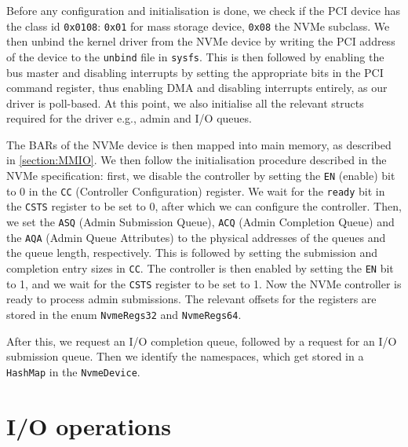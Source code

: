 Before any configuration and initialisation is done, we check if the PCI device has the class id \texttt{0x0108}: \texttt{0x01} for mass storage device, \texttt{0x08} the NVMe subclass.
We then unbind the kernel driver from the NVMe device by writing the PCI address of the device to the \texttt{unbind} file in \texttt{sysfs}. This is then followed by enabling the bus master and disabling interrupts by setting the appropriate bits in the PCI command register, thus enabling DMA and disabling interrupts entirely, as our driver is poll-based. At this point, we also initialise all the relevant structs required for the driver e.g., admin and I/O queues.

The BARs of the NVMe device is then mapped into main memory, as described in \autoref{section:MMIO}. We then follow the initialisation procedure described in the NVMe specification: first, we disable the controller by setting the \texttt{EN} (enable) bit to 0 in the \texttt{CC} (Controller Configuration) register. We wait for the \texttt{ready} bit in the \texttt{CSTS} register to be set to 0, after which we can configure the controller. Then, we set the \texttt{ASQ} (Admin Submission Queue), \texttt{ACQ} (Admin Completion Queue) and the \texttt{AQA} (Admin Queue Attributes) to the physical addresses of the queues and the queue length, respectively. This is followed by setting the submission and completion entry sizes in \texttt{CC}. The controller is then enabled by setting the \texttt{EN} bit to 1, and we wait for the \texttt{CSTS} register to be set to 1. Now the NVMe controller is ready to process admin submissions. The relevant offsets for the registers are stored in the enum \texttt{NvmeRegs32} and \texttt{NvmeRegs64}.

After this, we request an I/O completion queue, followed by a request for an I/O submission queue. Then we identify the namespaces, which get stored in a \texttt{HashMap} in the \texttt{NvmeDevice}.

\section{I/O operations}\label{subsection:io}

